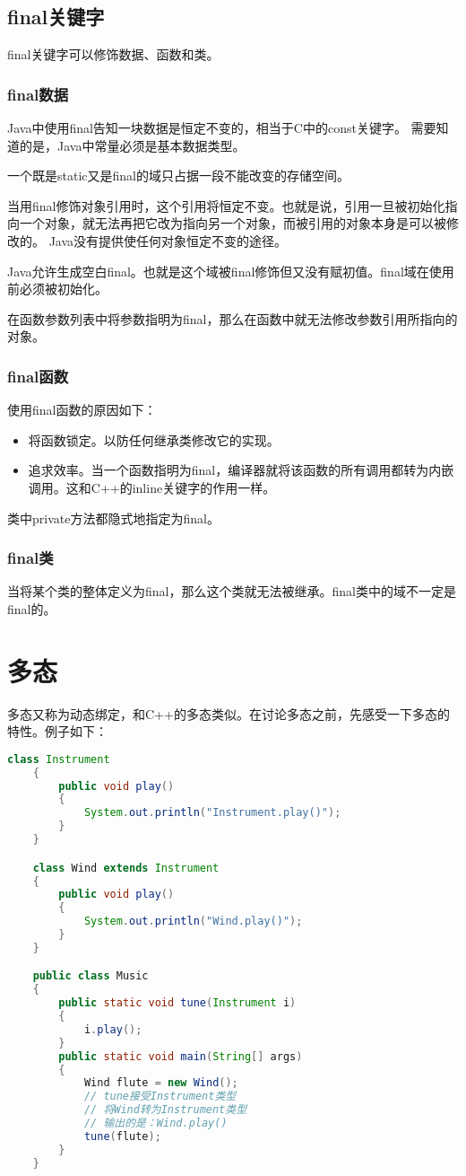 \documentclass[a4paper,left=2.5cm,right=2.5cm,11pt]{article}
\begin{document}
\subsection{final关键字}
	final关键字可以修饰数据、函数和类。
\subsubsection{final数据}
	Java中使用final告知一块数据是恒定不变的，相当于C中的const关键字。
	需要知道的是，Java中常量必须是基本数据类型。\par
	一个既是static又是final的域只占据一段不能改变的存储空间。\par
	当用final修饰对象引用时，这个引用将恒定不变。也就是说，引用一旦被初始化指向一个对象，就无法再把它改为指向另一个对象，而被引用的对象本身是可以被修改的。
	Java没有提供使任何对象恒定不变的途径。\par
	Java允许生成空白final。也就是这个域被final修饰但又没有赋初值。final域在使用前必须被初始化。\par
	在函数参数列表中将参数指明为final，那么在函数中就无法修改参数引用所指向的对象。
\subsubsection{final函数}
	使用final函数的原因如下：
	\begin{itemize}
		\item 将函数锁定。以防任何继承类修改它的实现。
		\item 追求效率。当一个函数指明为final，编译器就将该函数的所有调用都转为内嵌调用。这和C++的inline关键字的作用一样。
	\end{itemize}

	类中private方法都隐式地指定为final。

\subsubsection{final类}
	当将某个类的整体定义为final，那么这个类就无法被继承。final类中的域不一定是final的。

\clearpage

\section{多态}
	多态又称为动态绑定，和C++的多态类似。在讨论多态之前，先感受一下多态的特性。例子如下：
	\begin{lstlisting}[language = Java]
	class Instrument
	{
		public void play()
		{
			System.out.println("Instrument.play()");
		}
	}

	class Wind extends Instrument
	{
		public void play()
		{
			System.out.println("Wind.play()");
		}
	}

	public class Music
	{
		public static void tune(Instrument i)
		{
			i.play();
		}
		public static void main(String[] args)
		{
			Wind flute = new Wind();
			// tune接受Instrument类型
			// 将Wind转为Instrument类型
			// 输出的是：Wind.play()
			tune(flute); 
		}
	}
	\end{lstlisting}
\end{document}
